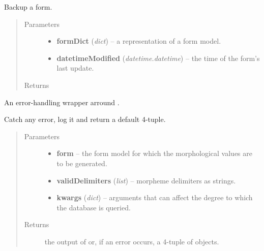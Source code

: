 \documentclass[letterpaper,10pt,english]{sphinxmanual}
\begin{document}
\begin{fulllineitems}
\label{api:onlinelinguisticdatabase.controllers.forms.backupForm}
Backup a form.
\begin{quote}\begin{description}
\item[{Parameters}] \leavevmode\begin{itemize}
\item {} 
\textbf{formDict} (\emph{dict}) -- a representation of a form model.

\item {} 
\textbf{datetimeModified} (\emph{datetime.datetime}) -- the time of the form's last update.

\end{itemize}

\item[{Returns}] \leavevmode
{}

\end{description}\end{quote}

\end{fulllineitems}


\begin{fulllineitems}
\label{api:onlinelinguisticdatabase.controllers.forms.compileMorphemicAnalysis}
An error-handling wrapper arround .

Catch any error, log it and return a default 4-tuple.
\begin{quote}\begin{description}
\item[{Parameters}] \leavevmode\begin{itemize}
\item {} 
\textbf{form} -- the form model for which the morphological values are to be generated.

\item {} 
\textbf{validDelimiters} (\emph{list}) -- morpheme delimiters as strings.

\item {} 
\textbf{kwargs} (\emph{dict}) -- arguments that can affect the degree to which the database is queried.

\end{itemize}

\item[{Returns}] \leavevmode
the output of  or, if an error
occurs, a 4-tuple of  objects.

\end{description}\end{quote}

\end{fulllineitems}
\end{document}
